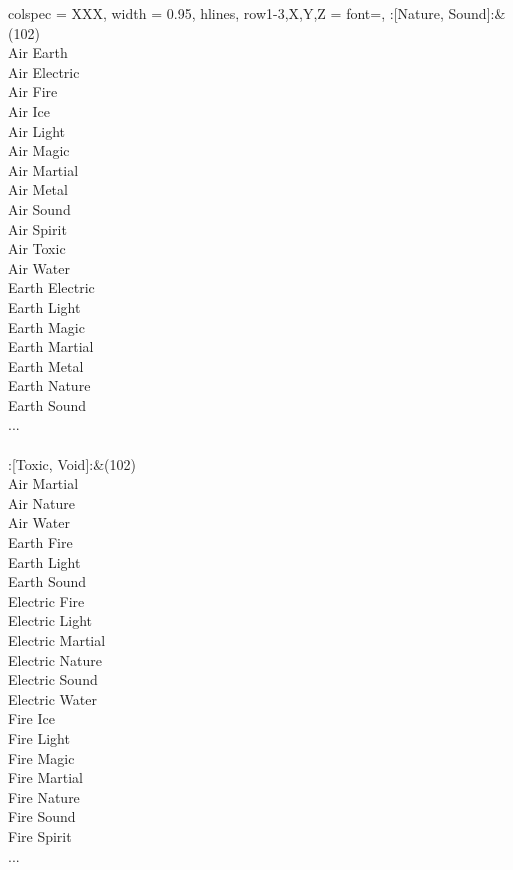 \begin{longtblr}[
	caption = {2v2 Defending Weak},
	label = {2v2-Defending-Weak},
]{
	colspec = {XXX}, width = 0.95\linewidth,
	hlines,
	row{1-3,X,Y,Z} = {font=\bfseries},
}
	:[Nature, Sound]:&{(102)\\
	Air Earth \\
	Air Electric \\
	Air Fire \\
	Air Ice \\
	Air Light \\
	Air Magic \\
	Air Martial \\
	Air Metal \\
	Air Sound \\
	Air Spirit \\
	Air Toxic \\
	Air Water \\
	Earth Electric \\
	Earth Light \\
	Earth Magic \\
	Earth Martial \\
	Earth Metal \\
	Earth Nature \\
	Earth Sound \\
	...\\
	}\\

	:[Toxic, Void]:&{(102)\\
	Air Martial \\
	Air Nature \\
	Air Water \\
	Earth Fire \\
	Earth Light \\
	Earth Sound \\
	Electric Fire \\
	Electric Light \\
	Electric Martial \\
	Electric Nature \\
	Electric Sound \\
	Electric Water \\
	Fire Ice \\
	Fire Light \\
	Fire Magic \\
	Fire Martial \\
	Fire Nature \\
	Fire Sound \\
	Fire Spirit \\
	...\\
	}\\


\end{longtblr}
